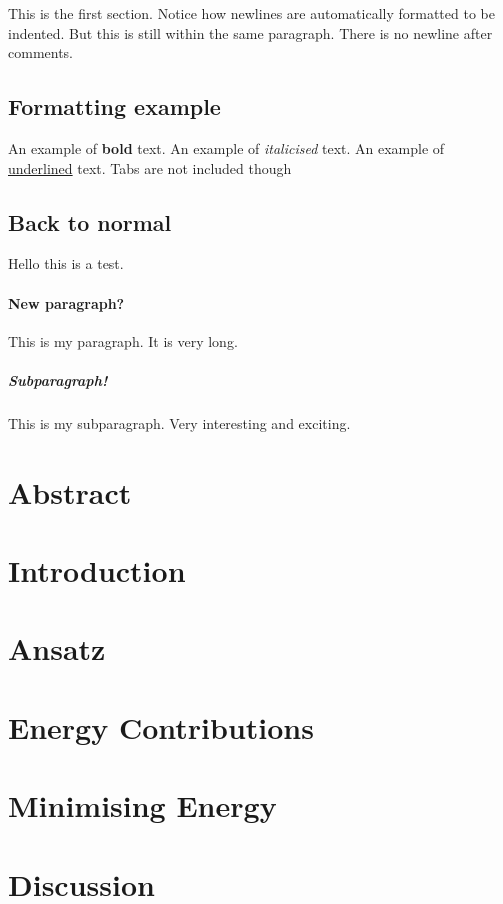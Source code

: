 \documentclass[a4paper]{article}
\begin{document}
This is the first section. Notice how newlines are automatically formatted to be indented.
But this is still within the same paragraph.
There is no newline after comments.


\subsection*{Formatting example}
An example of \textbf{bold} text.
An example of \textit{italicised} text.
An example of \underline{underlined} text.
Tabs are not included though

\subsection*{Back to normal}
Hello this is a test.
\paragraph{New paragraph?}
This is my paragraph. It is very long.
\subparagraph{Subparagraph!}
This is my subparagraph. Very interesting and exciting.
\blindtext{}

\tableofcontents


\section*{Abstract}
\blindtext{}

\section{Introduction}
\blindtext{}

\section{Ansatz}
\blindtext{}

\section{Energy Contributions}
\blindtext{}

\section{Minimising Energy}
\blindtext{}

\section{Discussion}
\blindtext{}
\end{document}
